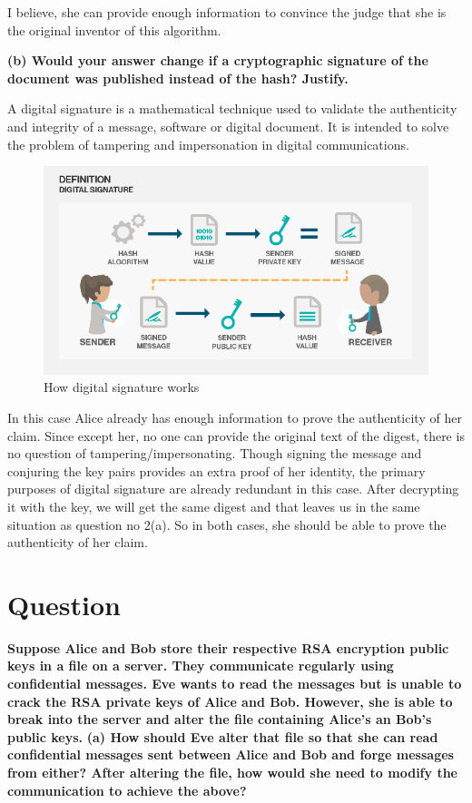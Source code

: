 \documentclass{article}
\begin{document}
I believe, she can provide enough information to convince the judge that she is the original inventor of this algorithm.




\newpage \textbf{(b) Would your answer change if a cryptographic signature of the document was published instead of the hash? Justify.}

A digital signature is a mathematical technique used to validate the authenticity and integrity of a message, software or digital document. It is intended to solve the problem of tampering and impersonation in digital communications.

\begin{figure}[h]
\centering
\includegraphics[scale=0.5]{dsig.png}
\caption{How digital signature works \citep{tt_dsig}}
\label{fig:digital_signature}
\end{figure}

In this case Alice already has enough information to prove the authenticity of her claim. Since except her, no one can provide the original text of the digest, there is no question of tampering/impersonating. Though signing the message and conjuring the key pairs provides an extra proof of her identity, the primary purposes of digital signature are already redundant in this case. After decrypting it with the key, we will get the same digest and that leaves us in the same situation as question no 2(a).
\newline \newline So in both cases, she should be able to prove the authenticity of her claim.


\section{Question}

\textbf{Suppose Alice and Bob store their respective RSA encryption public keys in a file on a server. They communicate regularly using confidential messages. Eve wants to read the messages but is unable to crack the RSA private keys of Alice and Bob. However, she is able to break into the server and alter the file containing Alice’s an Bob’s public keys.}
\newline \newline \textbf{(a) How should Eve alter that file so that she can read confidential messages sent between Alice and Bob and forge messages from either? After altering the file, how would she need to modify the communication to achieve the above?}
\end{document}
